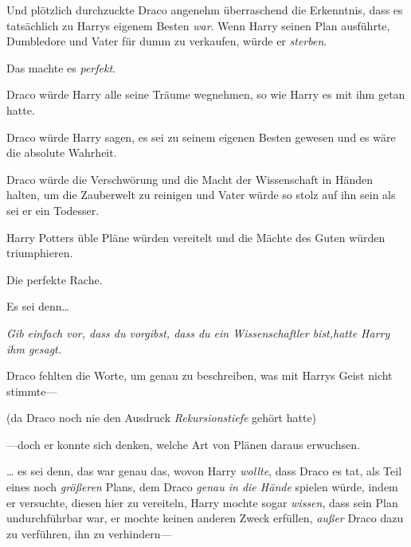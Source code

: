 Und plötzlich durchzuckte Draco angenehm überraschend die Erkenntnis, dass es tatsächlich zu Harrys eigenem Besten \emph{war}. Wenn Harry seinen Plan ausführte, Dumbledore und Vater für dumm zu verkaufen, würde er \emph{sterben}.

Das machte es \emph{perfekt}.

Draco würde Harry alle seine Träume wegnehmen, so wie Harry es mit ihm getan hatte.

Draco würde Harry sagen, es sei zu seinem eigenen Besten gewesen und es wäre die absolute Wahrheit.

Draco würde die Verschwörung und die Macht der Wissenschaft in Händen halten, um die Zauberwelt zu reinigen und Vater würde so stolz auf ihn sein als sei er ein Todesser.

Harry Potters üble Pläne würden vereitelt und die Mächte des Guten würden triumphieren.

Die perfekte Rache.

Es sei denn…

\emph{Gib einfach vor, dass du vorgibst, dass du ein Wissenschaftler bist,hatte Harry ihm gesagt.}

Draco fehlten die Worte, um genau zu beschreiben, was mit Harrys Geist nicht stimmte—

(da Draco noch nie den Ausdruck \emph{Rekursionstiefe} gehört hatte)

—doch er konnte sich denken, welche Art von Plänen daraus erwuchsen.

… es sei denn, das war genau das, wovon Harry \emph{wollte}, dass Draco es tat, als Teil eines noch \emph{größeren} Plans, dem Draco \emph{genau in die Hände} spielen würde, indem er versuchte, diesen hier zu vereiteln, Harry mochte sogar \emph{wissen}, dass sein Plan undurchführbar war, er mochte keinen anderen Zweck erfüllen, \emph{außer} Draco dazu zu verführen, ihn zu verhindern—

